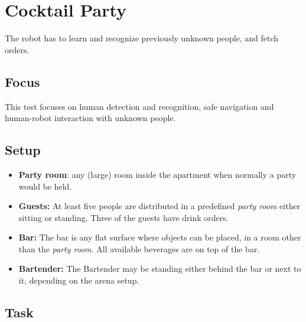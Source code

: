 \section{Cocktail Party}

The robot has to learn and recognize previously unknown people, and fetch orders.

\subsection{Focus}

This test focuses on human detection and recognition, safe navigation and human-robot interaction with unknown people.

\subsection{Setup}
\begin{itemize}
	\item \textbf{Party room}: any (large) room inside the apartment when normally a party would be held.
	\item \textbf{Guests:} At least five people are distributed in a predefined \textit{party room} either sitting or standing.
                Three of the guests have drink orders.
	\item \textbf{Bar:} The bar is any flat surface where objects can be placed, in a room other than the \textit{party room}.
                All available beverages are on top of the bar.
	\item \textbf{Bartender:} The Bartender may be standing either behind the bar or next to it, depending on the arena setup.
\end{itemize}

\subsection{Task}

